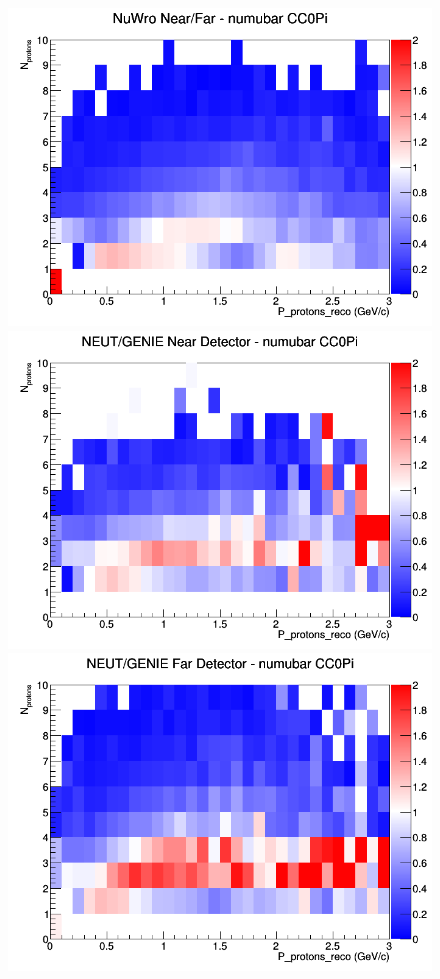 \begin{figure}[h]
\endminipage
{}
\includegraphics[width=\linewidth]{eff_N_P/FGT/protons/ratios/CC0Pi_NuWro_numubar_NF_N_P.png}
\endminipage
\newline
{}
\includegraphics[width=\linewidth]{eff_N_P/FGT/protons/ratios/CC0Pi_NEUT_GENIE_numubar_near_N_P.png}
\endminipage
{}
\includegraphics[width=\linewidth]{eff_N_P/FGT/protons/ratios/CC0Pi_NEUT_GENIE_numubar_far_N_P.png}

\end{figure}
